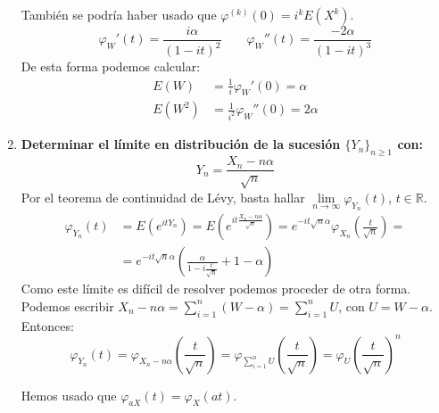\begin{exercise}
\begin{enumerate}
              También se podría haber usado que $\varphi^{(k)}(0) = i^k E(X^k)$.
              $$\varphi_W'(t) = \frac{i\alpha}{(1-it)^2} \qquad \varphi_W''(t) = \frac{-2\alpha}{(1-it)^3}$$
              De esta forma podemos calcular:
              \begin{align*}
                  E(W)   & = \frac{1}{i}\varphi_W'(0) = \alpha     \\
                  E(W^2) & = \frac{1}{i^2}\varphi_W''(0) = 2\alpha
              \end{align*}
        \item \textbf{Determinar el límite en distribución de la sucesión $\{Y_n\}_{n \geq 1}$ con:}
              $$Y_n = \frac{X_n - n\alpha}{\sqrt{n}}$$
              Por el teorema de continuidad de Lévy, basta hallar $\lim\limits_{n \to \infty} \varphi_{Y_n}(t)$, $t \in \mathbb{R}$.
              \begin{align*}
                  \varphi_{Y_n}(t) & = E(e^{itY_n}) = E(e^{it\frac{X_n-n\alpha}{\sqrt{n}}}) = e^{-it\sqrt{n}\alpha}\varphi_{X_n}\left(\frac{t}{\sqrt{n}}\right) = \\
                                   & = e^{-it\sqrt{n}\alpha} \left(\frac{\alpha}{1-i\frac{t}{\sqrt{n}}} + 1-\alpha\right)
              \end{align*}
              Como este límite es difícil de resolver podemos proceder de otra forma.
              Podemos escribir $X_n - n\alpha = \sum_{i=1}^n (W - \alpha) = \sum_{i=1}^n U$, con $U = W-\alpha$.
              Entonces:
              $$\varphi_{Y_n}(t) = \varphi_{X_n - n\alpha} \left(\frac{t}{\sqrt{n}}\right) = \varphi_{\sum_{i=1}^n U} \left(\frac{t}{\sqrt{n}}\right) = \varphi_U \left(\frac{t}{\sqrt{n}}\right)^n$$

              \begin{note}
                  Hemos usado que $\varphi_{aX}(t) = \varphi_X(at)$.
              \end{note}


\end{enumerate}
\end{exercise}
